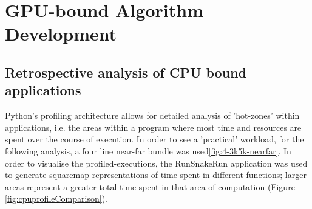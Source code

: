 \section{GPU-bound Algorithm Development}
\label{sec:algo-dev-gpu}
\subsection{Retrospective analysis of CPU bound applications}
Python's profiling architecture allows for detailed analysis of 'hot-zones' within applications, i.e. the areas within a program where most time and resources are spent over the course of execution. In order to see a 'practical' workload, for the following analysis, a four line near-far bundle was used\ref{fig:4-3k5k-nearfar}.
In order to visualise the profiled-executions, the RunSnakeRun application was used to generate squaremap representations of time spent in different functions; larger areas represent a greater total time spent in that area of computation (Figure \ref{fig:cpuprofileComparison}). 
